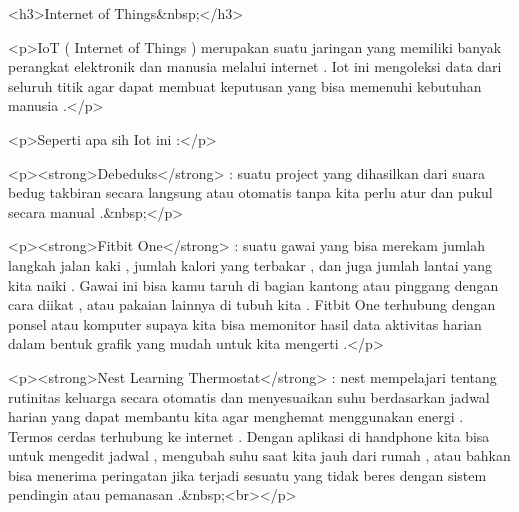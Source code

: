 <h3>Internet of Things&nbsp;</h3>



<p>IoT ( Internet of Things ) merupakan suatu jaringan yang memiliki banyak perangkat elektronik dan manusia melalui internet . Iot ini mengoleksi data dari seluruh titik agar dapat membuat keputusan yang bisa memenuhi kebutuhan manusia .</p>



<p>Seperti apa sih Iot ini :</p>



<p><strong>Debeduks</strong> : suatu project yang dihasilkan dari suara bedug takbiran secara langsung atau otomatis tanpa kita perlu atur dan pukul secara manual .&nbsp;</p>



<p><strong>Fitbit One</strong> : suatu gawai yang bisa merekam jumlah langkah jalan kaki , jumlah kalori yang terbakar , dan juga jumlah lantai yang kita naiki . Gawai ini bisa kamu taruh di bagian kantong atau pinggang dengan cara diikat , atau pakaian lainnya di tubuh kita . Fitbit One terhubung dengan ponsel atau komputer supaya kita bisa memonitor hasil data aktivitas harian dalam bentuk grafik yang mudah untuk kita mengerti .</p>



<p><strong>Nest Learning Thermostat</strong> : nest mempelajari tentang rutinitas keluarga secara otomatis dan menyesuaikan suhu berdasarkan jadwal harian yang dapat membantu kita agar menghemat menggunakan energi . Termos cerdas terhubung ke internet . Dengan aplikasi di handphone kita bisa untuk mengedit jadwal , mengubah suhu saat kita jauh dari rumah , atau bahkan bisa menerima peringatan jika terjadi sesuatu yang tidak beres dengan sistem pendingin atau pemanasan .&nbsp;<br></p>



